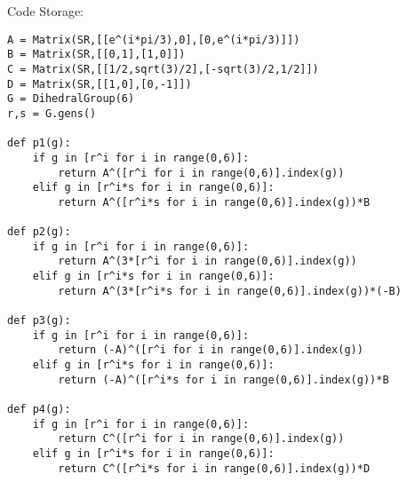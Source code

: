 \documentclass[10pt]{article}
\theoremstyle{plain}
\theoremstyle{remark}
\begin{document}
Code Storage:
\begin{verbatim}
A = Matrix(SR,[[e^(i*pi/3),0],[0,e^(i*pi/3)]])
B = Matrix(SR,[[0,1],[1,0]])
C = Matrix(SR,[[1/2,sqrt(3)/2],[-sqrt(3)/2,1/2]])
D = Matrix(SR,[[1,0],[0,-1]])
G = DihedralGroup(6)
r,s = G.gens()

def p1(g):
    if g in [r^i for i in range(0,6)]:
        return A^([r^i for i in range(0,6)].index(g))
    elif g in [r^i*s for i in range(0,6)]:
        return A^([r^i*s for i in range(0,6)].index(g))*B

def p2(g):
    if g in [r^i for i in range(0,6)]:
        return A^(3*[r^i for i in range(0,6)].index(g))
    elif g in [r^i*s for i in range(0,6)]:
        return A^(3*[r^i*s for i in range(0,6)].index(g))*(-B)

def p3(g):
    if g in [r^i for i in range(0,6)]:
        return (-A)^([r^i for i in range(0,6)].index(g))
    elif g in [r^i*s for i in range(0,6)]:
        return (-A)^([r^i*s for i in range(0,6)].index(g))*B

def p4(g):
    if g in [r^i for i in range(0,6)]:
        return C^([r^i for i in range(0,6)].index(g))
    elif g in [r^i*s for i in range(0,6)]:
        return C^([r^i*s for i in range(0,6)].index(g))*D
\end{verbatim}
\end{document}
